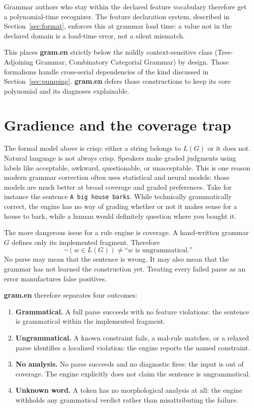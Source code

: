 \documentclass[11pt]{article}
\theoremstyle{definition}
\theoremstyle{plain}
\theoremstyle{remark}
\newcommand{\Gram}{\textbf{gram.en}}
\begin{document}
Grammar authors who stay within the declared feature vocabulary therefore get a
polynomial-time recognizer. The feature declaration system, described in
Section~\ref{sec:format}, enforces this at grammar load time: a value not in the
declared domain is a load-time error, not a silent mismatch.

This places \Gram{} strictly below the mildly context-sensitive class (Tree-Adjoining
Grammar, Combinatory Categorial Grammar) by design. Those formalisms handle cross-serial
dependencies of the kind discussed in Section~\ref{sec:pumping}. \Gram{} defers those
constructions to keep its core polynomial and its diagnoses explainable.

\section{Gradience and the coverage trap}
\label{sec:coverage}

The formal model above is crisp: either a string belongs to $L(G)$ or it does not. Natural
language is not always crisp. Speakers make graded judgments using labels like acceptable,
awkward, questionable, or unacceptable. This is one reason modern grammar correction often uses
statistical and neural models: those models are much better at broad coverage and graded preferences.
Take for instance the sentence \texttt{A big house barks}. While technically grammatically correct,
the engine has no way of grading whether or not it makes sense for a house to bark, while a human
would definitely question where you bought it.

The more dangerous issue for a rule engine is coverage. A hand-written grammar $G$ defines only
its implemented fragment. Therefore
\[
  \neg(w \in L(G)) \neq \text{``$w$ is ungrammatical.''}
\]
No parse may mean that the sentence is wrong. It may also mean that the grammar has not learned
the construction yet. Treating every failed parse as an error manufactures false positives.

\Gram{} therefore separates four outcomes:
\begin{enumerate}[leftmargin=2em]
  \item \textbf{Grammatical.} A full parse succeeds with no feature violations: the sentence
        is grammatical within the implemented fragment.
  \item \textbf{Ungrammatical.} A known constraint fails, a mal-rule matches, or a relaxed
        parse identifies a localized violation: the engine reports the named constraint.
  \item \textbf{No analysis.} No parse succeeds and no diagnostic fires: the input is out of
        coverage. The engine explicitly does not claim the sentence is ungrammatical.
  \item \textbf{Unknown word.} A token has no morphological analysis at all: the engine
        withholds any grammatical verdict rather than misattributing the failure.
\end{enumerate}
\end{document}
